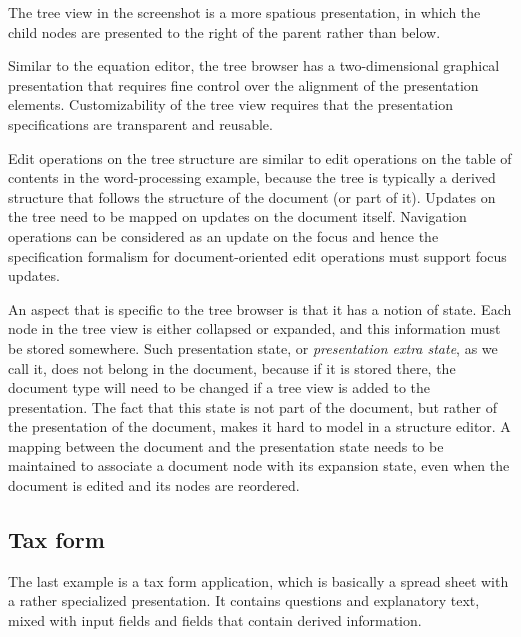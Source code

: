 The tree view in the screenshot is a more spatious presentation, in which the child nodes are presented to the right of the parent rather than below.



Similar to the equation editor, the tree browser has a two-dimensional graphical presentation that requires fine control over the alignment of the presentation elements. Customizability of the tree view requires that the presentation specifications are transparent and reusable. 

Edit operations on the tree structure are similar to edit operations on the table of contents in the word-processing example, because the tree is typically a derived structure that follows the structure of the document (or part of it). Updates on the tree need to be mapped on updates on the document itself. Navigation operations can be considered as an update on the  focus and hence the specification formalism for document-oriented edit operations must support focus updates.

An aspect that is specific to the tree browser is that it has a notion of state. Each node in the tree view is either collapsed or expanded, and this information must be stored somewhere. Such presentation state, or {\em presentation extra state}, as we call it, does not belong in the document, because if it is stored there, the document type will need to be changed if a tree view is added to the presentation. The fact that this state is not part of the document, but rather of the presentation of the document, makes it hard to model in a structure editor. A mapping between the document and the presentation state needs to be maintained to associate a document node with its expansion state, even when the document is edited and its nodes are reordered. 


%																
\subsection{Tax form}

The last example is a tax form application, which is basically a spread sheet with a rather specialized presentation. It contains questions and explanatory text, mixed with input fields and fields that contain derived information. 

